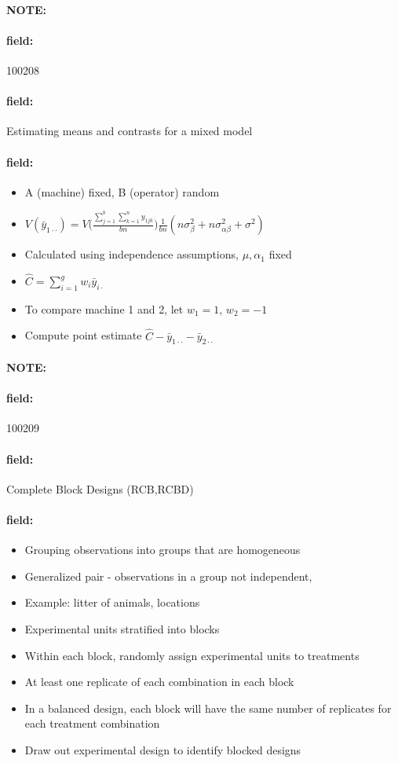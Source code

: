 \documentclass[12pt]{article}
\newenvironment{note}{\paragraph{NOTE:}}{}
\newenvironment{field}{\paragraph{field:}}{}
\begin{document}

\begin{note}
    \begin{field}
        \tiny 100208
    \end{field}
    \begin{field}
        Estimating means and contrasts for a mixed model
    \end{field}
    \begin{field}
        \begin{itemize}
          \item A (machine) fixed, B (operator) random
          \item $V(\bar{y}_{1\cdot\cdot}) = V\bigg( \frac{\sum_{j=1}^b\sum_{k=1}^n y_{1jk}}{bn}\bigg)\frac{1}{bn}(n\sigma_\beta^2 + n\sigma_{\alpha\beta}^2 + \sigma^2)$
          \item Calculated using independence assumptions, $\mu,\alpha_1$ fixed
          \item $\hat{C} = \sum_{i=1}^g w_i \bar{y}_{i\cdot}$
          \item To compare machine 1 and 2, let $w_1 =1$, $w_2 = -1$
          \item Compute point estimate $\hat{C} - \bar{y}_{1\cdot\cdot} - \bar{y}_{2\cdot\cdot}$
        \end{itemize}
    \end{field}
\end{note}

\begin{note}
    \begin{field}
        \tiny 100209
    \end{field}
    \begin{field}
        Complete Block Designs (RCB,RCBD)
    \end{field}
    \begin{field}
        \begin{itemize}
          \item Grouping observations into groups that are homogeneous
          \item Generalized pair - observations in a group not independent,
          \item Example: litter of animals, locations
          \item Experimental units stratified into blocks
          \item Within each block, randomly assign experimental units to treatments
          \item At least one replicate of each combination in each block
          \item In a balanced design, each block will have the same number of replicates for each treatment combination
          \item Draw out experimental design to identify blocked designs
        \end{itemize}
    \end{field}
\end{note}
\end{document}
